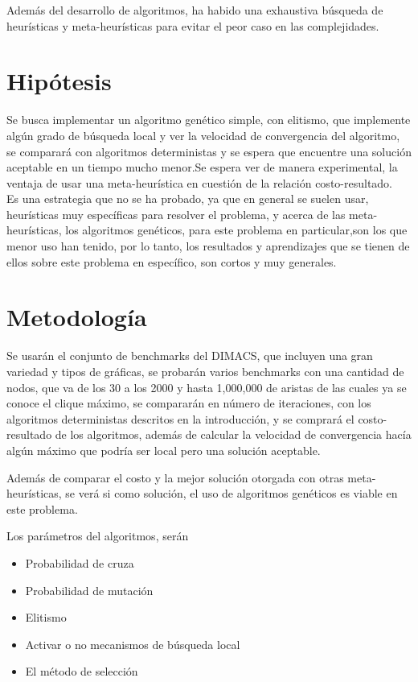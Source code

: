 \documentclass{article}
\begin{document}
    Además del desarrollo de algoritmos, ha habido una exhaustiva búsqueda de
heurísticas y meta-heurísticas para evitar el peor caso en las complejidades.
\section{Hipótesis}
Se busca implementar un algoritmo genético simple, con elitismo, que implemente algún grado de búsqueda local y ver la velocidad de convergencia del algoritmo, se comparará con algoritmos deterministas y se espera que encuentre una solución aceptable en un tiempo mucho menor.Se espera ver de manera experimental, la ventaja de usar una meta-heurística en cuestión de la relación costo-resultado.
\\
    Es una estrategia que no se ha probado, ya que en general se suelen usar,
heurísticas muy específicas para resolver el problema, y acerca de las meta-heurísticas, los algoritmos genéticos, para este problema en particular,son los que menor uso han tenido, por lo tanto, los resultados y aprendizajes que se tienen de ellos sobre este problema en específico, son cortos y muy generales. 

\section{Metodología}

Se usarán el conjunto de benchmarks del DIMACS, que incluyen una gran variedad y tipos de gráficas, se probarán varios benchmarks con una cantidad de nodos, que va de los 30 a los 2000 y hasta 1,000,000 de aristas de las cuales ya se conoce el clique máximo, se compararán en número de iteraciones, con los algoritmos deterministas descritos en la introducción, y se comprará el costo-resultado de los algoritmos, además de calcular la velocidad de convergencia hacía algún máximo que podría ser local pero una solución aceptable.

    Además de comparar el costo y la mejor solución otorgada con otras meta-heurísticas, se verá si como solución, el uso de algoritmos genéticos es viable en este problema.
    
Los parámetros del algoritmos, serán 
    \begin{itemize}
        \item Probabilidad de cruza
        \item Probabilidad de mutación
        \item Elitismo
        \item Activar o no mecanismos de búsqueda local
        \item El método de selección
    \end{itemize}
\end{document}
